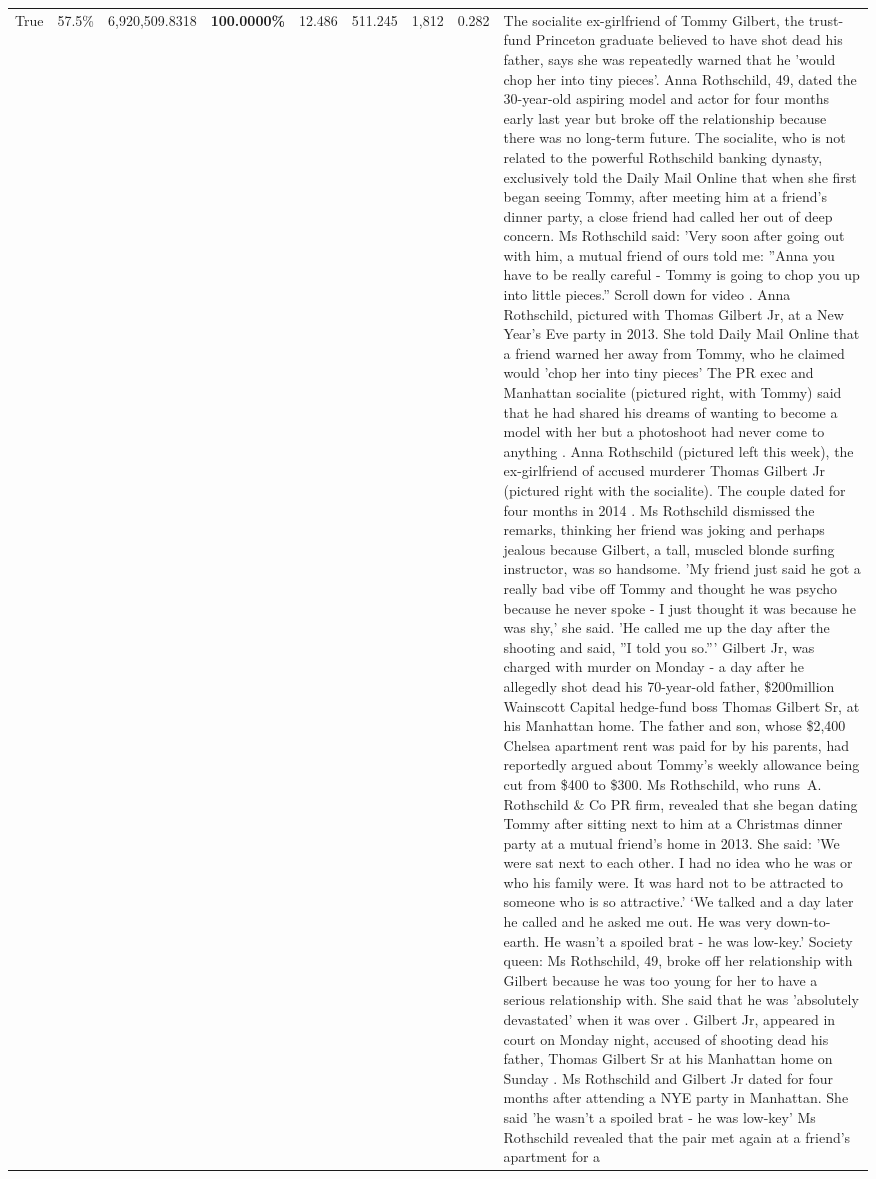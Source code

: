 \begin{table}[H]
\begin{tabular}{lllrlllll}
True & 57.5\% & 6,920,509.8318 & \bfseries \color{red} 100.0000\% & 12.486 & 511.245 & 1,812 & 0.282 & The socialite ex-girlfriend of Tommy Gilbert, the trust-fund Princeton graduate believed to have shot dead his father, says she was repeatedly warned that he 'would chop her into tiny pieces'. Anna Rothschild, 49, dated the 30-year-old aspiring model and actor for four months early last year but broke off the relationship because there was no long-term future. The socialite, who is not related to the powerful Rothschild banking dynasty, exclusively told the Daily Mail Online that when she first began seeing Tommy, after meeting him at a friend's dinner party, a close friend had called her out of deep concern. Ms Rothschild said: 'Very soon after going out with him, a mutual friend of ours told me: ''Anna you have to be really careful - Tommy is going to chop you up into little pieces.'' Scroll down for video . Anna Rothschild, pictured with Thomas Gilbert Jr, at a New Year's Eve party in 2013. She told Daily Mail Online that a friend warned her away from Tommy, who he claimed would 'chop her into tiny pieces' The PR exec and Manhattan socialite (pictured right, with Tommy) said that he had shared his dreams of wanting to become a model with her but a photoshoot had never come to anything . Anna Rothschild (pictured left this week), the ex-girlfriend of accused murderer Thomas Gilbert Jr (pictured right with the socialite). The couple dated for four months in 2014 . Ms Rothschild dismissed the remarks, thinking her friend was joking and perhaps jealous because Gilbert, a tall, muscled blonde surfing instructor, was so handsome. 'My friend just said he got a really bad vibe off Tommy and thought he was psycho because he never spoke - I just thought it was because he was shy,' she said. 'He called me up the day after the shooting and said, ''I told you so.''' Gilbert Jr, was charged with murder on Monday - a day after he allegedly shot dead his 70-year-old father, \$200million Wainscott Capital hedge-fund boss Thomas Gilbert Sr, at his Manhattan home. The father and son, whose \$2,400 Chelsea apartment rent was paid for by his parents, had reportedly argued about Tommy's weekly allowance being cut from \$400 to \$300. Ms Rothschild, who runs A. Rothschild \& Co PR firm, revealed that she began dating Tommy after sitting next to him at a Christmas dinner party at a mutual friend's home in 2013. She said: 'We were sat next to each other. I had no idea who he was or who his family were. It was hard not to be attracted to someone who is so attractive.' ‘We talked and a day later he called and he asked me out. He was very down-to-earth. He wasn’t a spoiled brat - he was low-key.’ Society queen: Ms Rothschild, 49, broke off her relationship with Gilbert because he was too young for her to have a serious relationship with. She said that he was 'absolutely devastated' when it was over . Gilbert Jr, appeared in court on Monday night, accused of shooting dead his father, Thomas Gilbert Sr at his Manhattan home on Sunday . Ms Rothschild and Gilbert Jr dated for four months after attending a NYE party in Manhattan. She said 'he wasn't a spoiled brat - he was low-key' Ms Rothschild revealed that the pair met again at a friend’s apartment for a 
\end{tabular}
\end{table}
